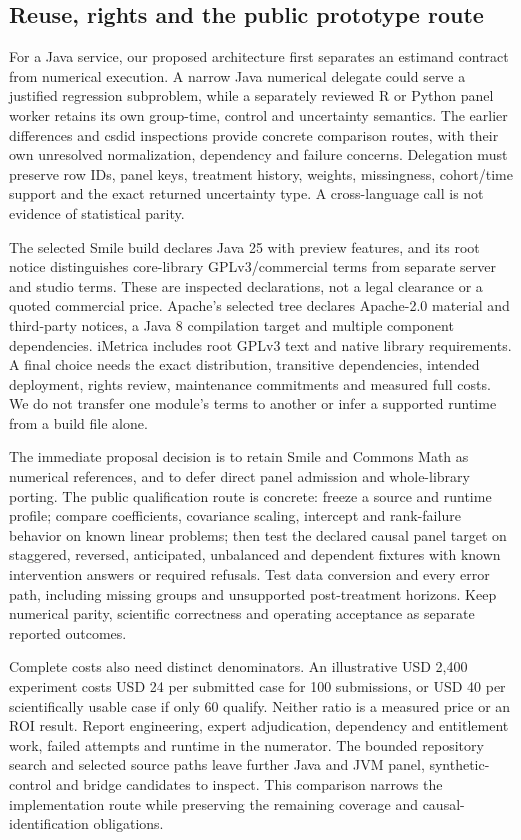 \subsection{Reuse, rights and the public prototype route}
For a Java service, our proposed architecture first separates an estimand
contract from numerical execution. A narrow Java numerical delegate could
serve a justified regression subproblem, while a separately reviewed R or
Python panel worker retains its own group-time, control and uncertainty
semantics. The earlier differences and csdid inspections provide concrete
comparison routes, with their own unresolved normalization, dependency and
failure concerns. Delegation must preserve row IDs, panel keys, treatment
history, weights, missingness, cohort/time support and the exact returned
uncertainty type. A cross-language call is not evidence of statistical parity.
\citep{exec24_panelpy_differences,exec24_panelpy_csdid,exec25_paneljava_reference}

The selected Smile build declares Java 25 with preview features, and its
root notice distinguishes core-library GPLv3/commercial terms from separate
server and studio terms. These are inspected declarations, not a legal
clearance or a quoted commercial price. Apache's selected tree declares
Apache-2.0 material and third-party notices, a Java 8 compilation target
and multiple component dependencies. iMetrica includes root GPLv3 text and
native library requirements. A final choice needs the exact distribution,
transitive dependencies, intended deployment, rights review, maintenance
commitments and measured full costs. We do not transfer one module's terms
to another or infer a supported runtime from a build file alone.
\citep{exec25_paneljava_smile,exec25_paneljava_commons,exec25_paneljava_imetrica}

The immediate proposal decision is to retain Smile and Commons Math as
numerical references, and to defer direct panel admission and whole-library
porting. The public qualification route is concrete: freeze a source and
runtime profile; compare coefficients, covariance scaling, intercept and
rank-failure behavior on known linear problems; then test the declared causal
panel target on staggered, reversed, anticipated, unbalanced and dependent
fixtures with known intervention answers or required refusals. Test data
conversion and every error path, including missing groups and unsupported
post-treatment horizons. Keep numerical parity, scientific correctness and
operating acceptance as separate reported outcomes.
\citep{exec25_paneljava_reference}

Complete costs also need distinct denominators. An illustrative USD 2,400
experiment costs USD 24 per submitted case for 100 submissions, or USD 40
per scientifically usable case if only 60 qualify. Neither ratio is a
measured price or an ROI result. Report engineering, expert adjudication,
dependency and entitlement work, failed attempts and runtime in the numerator.
The bounded repository search and selected source paths leave further Java
and JVM panel, synthetic-control and bridge candidates to inspect. This
comparison narrows the implementation route while preserving the remaining
coverage and causal-identification obligations.~\citep{exec25_paneljava_reference}
